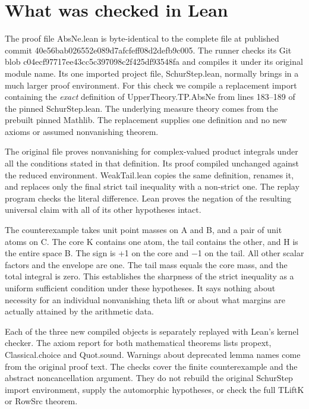 \documentclass[11pt,letterpaper]{article}
\begin{document}
\appendix
\clearpage\section{What was checked in Lean}
The proof file AbsNe.lean is byte-identical to the complete file at published commit {\ttfamily\small 40e56bab026552\allowbreak{}e089d7afcfeff0\allowbreak{}8d2defb9c005}. The runner checks its Git blob {\ttfamily\small c04ecf97717ee4\allowbreak{}3cc5c397098c2f\allowbreak{}425df93548fa} and compiles it under its original module name. Its one imported project file, SchurStep.lean, normally brings in a much larger proof environment. For this check we compile a replacement import containing the \emph{exact} definition of UpperTheory.TP.AbsNe from lines 183–189 of the pinned SchurStep.lean. The underlying measure theory comes from the prebuilt pinned Mathlib. The replacement supplies one definition and no new axioms or assumed nonvanishing theorem.

The original file proves nonvanishing for complex-valued product integrals under all the conditions stated in that definition. Its proof compiled unchanged against the reduced environment. WeakTail.lean copies the same definition, renames it, and replaces only the final strict tail inequality with a non-strict one. The replay program checks the literal difference. Lean proves the negation of the resulting universal claim with all of its other hypotheses intact.

The counterexample takes unit point masses on A and B, and a pair of unit atoms on C. The core K contains one atom, the tail contains the other, and H is the entire space B. The sign is +1 on the core and \ensuremath{-}1 on the tail. All other scalar factors and the envelope are one. The tail mass equals the core mass, and the total integral is zero. This establishes the sharpness of the strict inequality as a uniform sufficient condition under these hypotheses. It says nothing about necessity for an individual nonvanishing theta lift or about what margins are actually attained by the arithmetic data.

Each of the three new compiled objects is separately replayed with Lean's kernel checker. The axiom report for both mathematical theorems lists propext, Classical.choice and Quot.sound. Warnings about deprecated lemma names come from the original proof text. The checks cover the finite counterexample and the abstract noncancellation argument. They do not rebuild the original SchurStep import environment, supply the automorphic hypotheses, or check the full TLiftK or RowSrc theorem.
\end{document}

